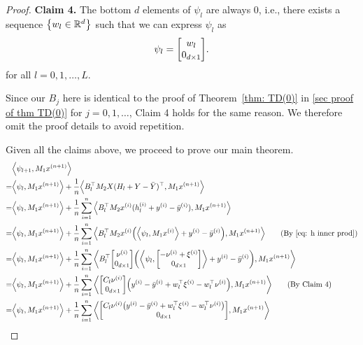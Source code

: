 \documentclass{article}
\newcommand{\explain}[1]{\tag*{(#1)}}
\newcommand{\R}{\mathbb{R}}
\newcommand{\indot}[2]{{\left<#1, #2\right>}}
\begin{document}
\begin{proof}
    \textbf{Claim 4.} The bottom $d$ elements of $\psi_l$ are always 0, i.e., there exists a sequence $\qty{w_l \in \R^d}$ such that we can express $\psi_l$ as
    \begin{align}
        \psi_l = \mqty[w_l \\ 0_{d \times 1}]. \label{eq: avg theta_l sparsity}
    \end{align}
    for all $l = 0,1,\dots, L$.

    Since our $B_j$ here is identical to the proof of Theorem~\ref{thm: TD(0)} in \ref{sec proof of thm TD(0)} for $j = 0, 1, \dots$, Claim 4 holds for the same reason.
    We therefore omit the proof details to avoid repetition.

    Given all the claims above, we proceed to prove our main theorem.
     \begin{align}
        &\indot{\psi_{l+1}}{M_1 x^{(n+1)}}\\ 
        =&\indot{\psi_l}{M_1 x^{(n+1)}} + \frac{1}{n}\indot{B_l^\top M_2 X (H_l + Y - \bar{Y})^\top}{M_1 x^{(n+1)}}\\
        =&\indot{\psi_l}{M_1 x^{(n+1)}} + \frac{1}{n}\sum_{i=1}^n \indot{B_l^\top M_2 x^{(i)} (h_l^{(i)} + y^{(i)} - \bar{y}^{(i)})}{M_1 x^{(n+1)}}\\
        =&\indot{\psi_l}{M_1 x^{(n+1)}} + 
        \frac{1}{n} \sum_{i=1}^n \indot{B_l^\top M_2 x^{(i)} \qty(\indot{\psi_l}{M_1 x^{(i)}} + y^{(i)} - \bar{y}^{(i)})}{M_1 x^{(n+1)}} \explain{By \eqref{eq: h inner prod}}\\
        =&\indot{\psi_l}{M_1 x^{(n+1)}} + 
        \frac{1}{n} \sum_{i=1}^n 
        \indot{B_l^\top \mqty[\nu^{(i)}\\0_{d\times 1}] 
        \qty( \indot{\psi_l}{\mqty[-\nu^{(i)} + \xi^{(i)}\\ 0_{d\times 1}]} + y^{(i)} - \bar{y}^{(i)})}{M_1 x^{(n+1)}}\\
        =&\indot{\psi_l}{M_1 x^{(n+1)}} + 
        \frac{1}{n} \sum_{i=1}^n 
        \indot{\mqty[C_l \nu^{(i)}\\0_{d\times 1}] 
        \qty( y^{(i)} - \bar{y}^{(i)} +  w_l^\top \xi^{(i)} - w_l^\top \nu^{(i)} )}{M_1 x^{(n+1)}} \explain{By Claim 4}\\
        =&\indot{\psi_l}{M_1 x^{(n+1)}} + 
        \frac{1}{n} \sum_{i=1}^n 
        \indot{\mqty[C_l \nu^{(i)} \qty(y^{(i)} - \bar{y}^{(i)} + w_l^\top \xi^{(i)} - w_l^\top \nu^{(i)})\\0_{d\times 1}]}
        {M_1 x^{(n+1)}}\\
    \end{align}


\end{proof}
\end{document}
